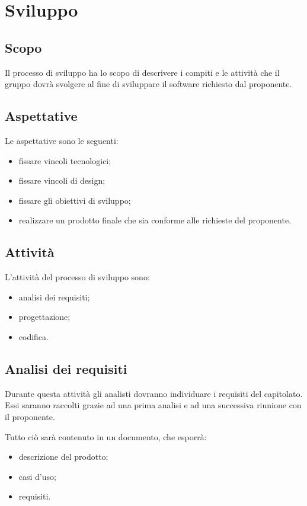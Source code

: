\section{Sviluppo}

\subsection{Scopo}
Il processo di sviluppo ha lo scopo di descrivere i compiti e le attività che il gruppo dovrà svolgere al fine di sviluppare il software richiesto dal proponente.

\subsection{Aspettative}
Le aspettative sono le seguenti:
\begin{itemize}
    \item fissare vincoli tecnologici;
    \item fissare vincoli di design;
    \item fissare gli obiettivi di sviluppo;
    \item realizzare un prodotto finale che sia conforme alle richieste del proponente.
\end{itemize}

\subsection{Attività}

L'attività del processo di sviluppo sono:
\begin{itemize}
    \item analisi dei requisiti;
    \item progettazione;
    \item codifica.
\end{itemize}

\subsection{Analisi dei requisiti}
Durante questa attività gli analisti dovranno individuare i requisiti del capitolato. Essi saranno raccolti grazie ad una prima analisi e ad una successiva riunione con il proponente.

Tutto ciò sarà contenuto in un documento, che esporrà:
\begin{itemize}
    \item descrizione del prodotto;
    \item casi d'uso;
    \item requisiti.
\end{itemize}

